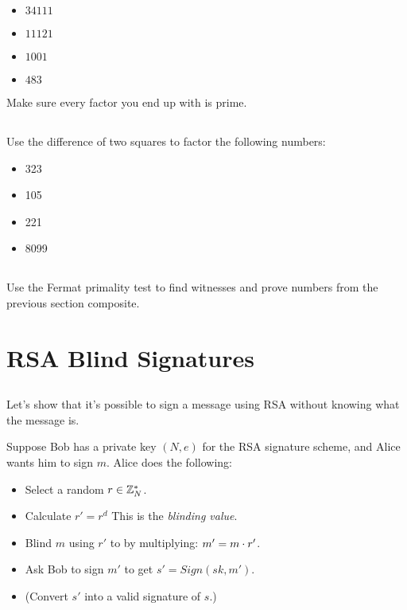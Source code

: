 \documentclass[12pt]{article}
\begin{document}
\begin{itemize}
\item $34111$
\item $11121$
\item $1001$
\item $483$
\end{itemize}

Make sure every factor you end up with is prime.

\subsection{}


Use the difference of two squares to factor the following numbers:

\begin{itemize}
\item 323 
\item 105 
\item 221 
\item 8099 
\end{itemize}

\subsection{}

Use the Fermat primality test to find witnesses and prove numbers from the previous section composite.


\section{RSA Blind Signatures}

\subsection{}

Let's show that it's possible to sign a message using RSA without knowing what the message is.

Suppose Bob has a private key $(N, e)$ for the RSA signature scheme, and Alice wants him to sign $m$. Alice does the following:

\begin{itemize}
\item Select a random $r \in \mathbb{Z}_N^*$.
\item Calculate $r' = r^d$ This is the \emph{blinding value}.
\item Blind $m$ using $r'$ to by multiplying: $m' = m \cdot r'$.
\item Ask Bob to sign $m'$ to get $s' = Sign(sk, m')$.
\item (Convert $s'$ into a valid signature of $s$.)
\end{itemize}
\end{document}
